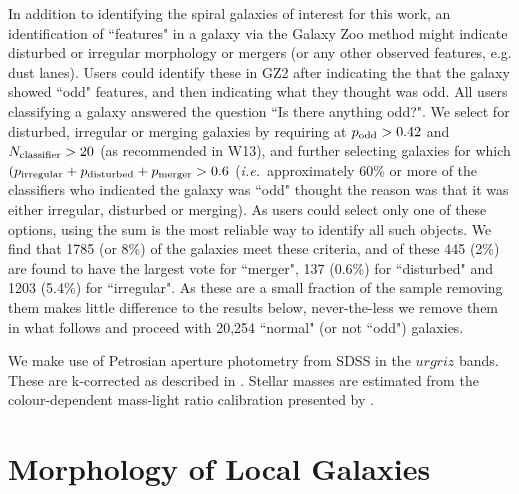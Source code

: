 \documentclass[usenatbib]{mn2e}
\newcommand{\ie}{{\it i.e.}}
\begin{document}
In addition to identifying the spiral galaxies of interest for this work, an identification of ``features" in a galaxy via the Galaxy Zoo method might indicate disturbed or irregular morphology or mergers (or any other observed features, e.g. dust lanes). Users could identify these in GZ2 after indicating the that the galaxy showed ``odd" features, and then indicating what they thought was odd. All users classifying a galaxy answered the question ``Is there anything odd?". We select for disturbed, irregular or merging galaxies by requiring at $p_{\rm odd} > 0.42$ and $N_{\rm classifier}>20$ (as recommended in W13), and further selecting galaxies for which $(p_{\rm irregular}+p_{\rm disturbed} + p_{\rm merger} > 0.6$ (\ie ~approximately 60\% or more of the classifiers who indicated the galaxy was ``odd" thought the reason was that it was either irregular, disturbed or merging). As users could select only one of these options, using the sum is the most reliable way to identify all such objects. We find that 1785 (or 8\%) of  the galaxies meet these criteria, and of these 445 (2\%) are found to have the largest vote for ``merger", 137 (0.6\%)  for ``disturbed" and 1203 (5.4\%) for ``irregular". As these are a small fraction of the sample removing them makes little difference to the results below, never-the-less we remove them in what follows and proceed with 20,254 ``normal" (or not ``odd") galaxies. 

We make use of Petrosian aperture photometry from SDSS in the $urgriz$ bands. These are k-corrected as described in \citet{Bamford2009}. Stellar masses are estimated from the colour-dependent mass-light ratio calibration presented by \citet{Baldry2008}. 

\section{Morphology of Local Galaxies} \label{demographics}

\end{document}

